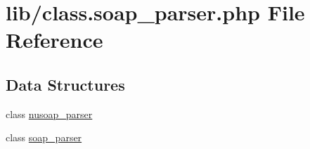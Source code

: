 \hypertarget{class_8soap__parser_8php}{}\section{lib/class.soap\+\_\+parser.\+php File Reference}
\label{class_8soap__parser_8php}
\subsection*{Data Structures}
\begin{DoxyCompactItemize}
\item 
class \hyperlink{classnusoap__parser}{nusoap\+\_\+parser}
\item 
class \hyperlink{classsoap__parser}{soap\+\_\+parser}
\end{DoxyCompactItemize}
